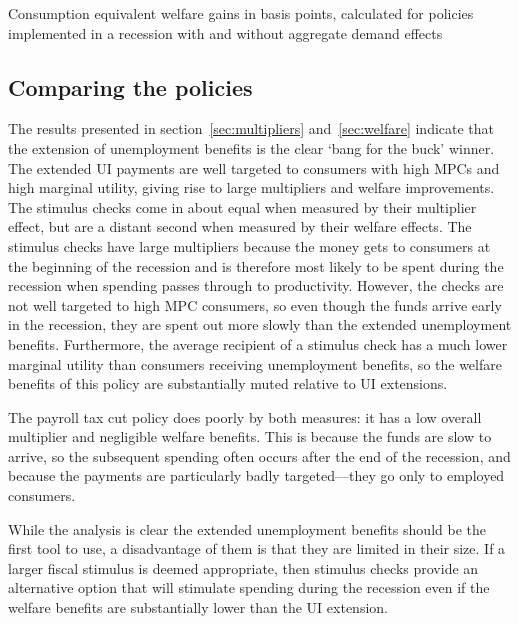 \documentclass[../HAFiscal]{subfiles}
\begin{document}
\begin{table}[ht] 
	\center
	
	\caption{Consumption equivalent welfare gains in basis points, calculated for policies implemented in a recession with and without aggregate demand effects}
	\label{welfare}
\end{table}

\subsection{Comparing the policies} 

The results presented in section~\ref{sec:multipliers} and~\ref{sec:welfare} indicate that the extension of unemployment benefits is the clear `bang for the buck' winner. The extended UI payments are well targeted to consumers with high MPCs and high marginal utility, giving rise to large multipliers and welfare improvements. The stimulus checks come in about equal when measured by their multiplier effect, but are a distant second when measured by their welfare effects. The stimulus checks have large multipliers because the money gets to consumers at the beginning of the recession and is therefore most likely to be spent during the recession when spending passes through to productivity.  However, the checks are not well targeted to high MPC consumers, so even though the funds arrive early in the recession, they are spent out more slowly than the extended unemployment benefits. Furthermore, the average recipient of a stimulus check has a much lower marginal utility than consumers receiving unemployment benefits, so the welfare benefits of this policy are substantially muted relative to UI extensions.

The payroll tax cut policy does poorly by both measures: it has a low overall multiplier and negligible welfare benefits. This is because the funds are slow to arrive, so the subsequent spending often occurs after the end of the recession, and because the payments are particularly badly targeted---they go only to employed consumers.

While the analysis is clear the extended unemployment benefits should be the first tool to use, a disadvantage of them is that they are limited in their size. If a larger fiscal stimulus is deemed appropriate, then stimulus checks provide an alternative option that will stimulate spending during the recession even if the welfare benefits are substantially lower than the UI extension.
\end{document}
